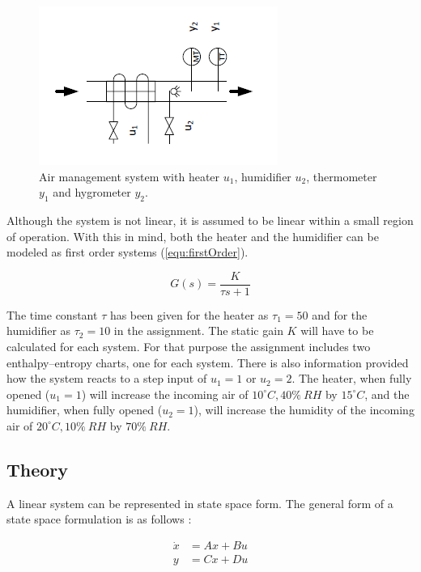 \documentclass[a4paper, titlepage]{article}
\begin{document}
\begin{figure}[h!]
\center
\includegraphics[scale=1]{../figures/heaterHumidifier.png}
\caption{Air management system with heater $u_1$, humidifier $u_2$, thermometer $y_1$ and hygrometer $y_2$.}
\label{fig:airSystem}
\end{figure}

Although the system is not linear, it is assumed to be linear within a small region of operation.
With this in mind, both the heater and the humidifier can be modeled as first order systems (\ref{equ:firstOrder}).

\begin{equation}
G(s) = \frac{K}{\tau s + 1}
\label{equ:firstOrder}
\end{equation}

The time constant $\tau$ has been given for the heater as $\tau_1=50$ and for the humidifier as $\tau_2=10$ in the assignment.
The static gain $K$ will have to be calculated for each system.
For that purpose the assignment includes two enthalpy–entropy charts, one for each system.
There is also information provided how the system reacts to a step input of $u_1 = 1$ or $u_2 = 2$.
The heater, when fully opened ($u_1 = 1$) will increase the incoming air of $10^\circ C, 40\% \: RH$ by $15^\circ C$, and the humidifier, when fully opened ($u_2 = 1$), will increase the humidity of the incoming air of $20^\circ C, 10\% \: RH$ by $70\% \: RH$.

\subsection{Theory}
A linear system can be represented in state space form.
The general form of a state space formulation is as follows \citep[p.~31]{glad00}:

\begin{equation}
\begin{split}
\dot{x} &= Ax + Bu \\
y &= Cx + Du
\end{split}
\label{equ:stateSpace}
\end{equation}
\end{document}
